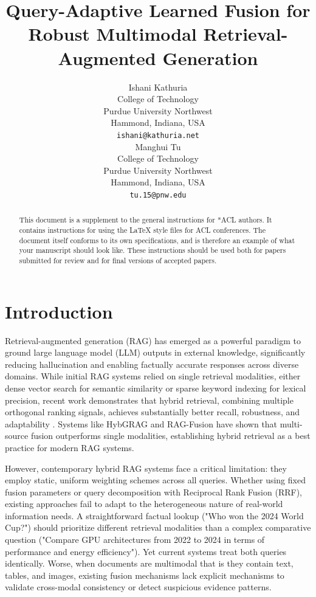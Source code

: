 \documentclass[11pt]{article}
\title{Query-Adaptive Learned Fusion for Robust Multimodal Retrieval-Augmented Generation}
\author{Ishani Kathuria \\
  College of Technology \\
  Purdue University Northwest \\
  Hammond, Indiana, USA \\
  \texttt{ishani@kathuria.net} \\\And
  Manghui Tu \\
  College of Technology \\
  Purdue University Northwest \\
  Hammond, Indiana, USA \\
  \texttt{tu.15@pnw.edu} \\}
\begin{document}
\maketitle
\begin{abstract}
This document is a supplement to the general instructions for *ACL authors. It contains instructions for using the \LaTeX{} style files for ACL conferences.
The document itself conforms to its own specifications, and is therefore an example of what your manuscript should look like.
These instructions should be used both for papers submitted for review and for final versions of accepted papers.
\end{abstract}

\section{Introduction}

Retrieval-augmented generation (RAG) has emerged as a powerful paradigm to ground large language model (LLM) outputs in external knowledge, significantly reducing hallucination and enabling factually accurate responses across diverse domains. While initial RAG systems relied on single retrieval modalities, either dense vector search for semantic similarity or sparse keyword indexing for lexical precision, recent work demonstrates that hybrid retrieval, combining multiple orthogonal ranking signals, achieves substantially better recall, robustness, and adaptability \cite{ahmad_benchmarking_2025}. Systems like HybGRAG \cite{lee_hybgrag_2025} and RAG-Fusion \cite{rackauckas_rag-fusion_2024} have shown that multi-source fusion outperforms single modalities, establishing hybrid retrieval as a best practice for modern RAG systems.

However, contemporary hybrid RAG systems face a critical limitation: they employ static, uniform weighting schemes across all queries. Whether using fixed fusion parameters or query decomposition with Reciprocal Rank Fusion (RRF), existing approaches fail to adapt to the heterogeneous nature of real-world information needs. A straightforward factual lookup ("Who won the 2024 World Cup?") should prioritize different retrieval modalities than a complex comparative question ("Compare GPU architectures from 2022 to 2024 in terms of performance and energy efficiency"). Yet current systems treat both queries identically. Worse, when documents are multimodal that is they contain text, tables, and images, existing fusion mechanisms lack explicit mechanisms to validate cross-modal consistency or detect suspicious evidence patterns.
\end{document}
